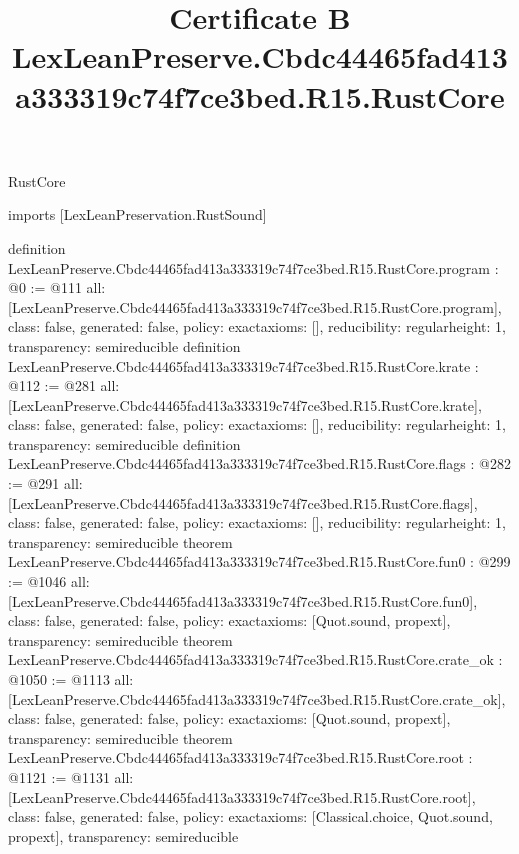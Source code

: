 \begin{lexlean}{RustCore}
\title{Certificate B LexLeanPreserve.Cbdc44465fad413a333319c74f7ce3bed.R15.RustCore}
\begin{coremodule}
imports [LexLeanPreservation.RustSound]

definition LexLeanPreserve.Cbdc44465fad413a333319c74f7ce3bed.R15.RustCore.program : @0 := @111 {
  all: [LexLeanPreserve.Cbdc44465fad413a333319c74f7ce3bed.R15.RustCore.program],
  class: false,
  generated: false,
  policy: exact{axioms: []},
  reducibility: regular{height: 1},
  transparency: semireducible
}
definition LexLeanPreserve.Cbdc44465fad413a333319c74f7ce3bed.R15.RustCore.krate : @112 := @281 {
  all: [LexLeanPreserve.Cbdc44465fad413a333319c74f7ce3bed.R15.RustCore.krate],
  class: false,
  generated: false,
  policy: exact{axioms: []},
  reducibility: regular{height: 1},
  transparency: semireducible
}
definition LexLeanPreserve.Cbdc44465fad413a333319c74f7ce3bed.R15.RustCore.flags : @282 := @291 {
  all: [LexLeanPreserve.Cbdc44465fad413a333319c74f7ce3bed.R15.RustCore.flags],
  class: false,
  generated: false,
  policy: exact{axioms: []},
  reducibility: regular{height: 1},
  transparency: semireducible
}
theorem LexLeanPreserve.Cbdc44465fad413a333319c74f7ce3bed.R15.RustCore.fun0 : @299 := @1046 {
  all: [LexLeanPreserve.Cbdc44465fad413a333319c74f7ce3bed.R15.RustCore.fun0],
  class: false,
  generated: false,
  policy: exact{axioms: [Quot.sound, propext]},
  transparency: semireducible
}
theorem LexLeanPreserve.Cbdc44465fad413a333319c74f7ce3bed.R15.RustCore.crate_ok : @1050 := @1113 {
  all: [LexLeanPreserve.Cbdc44465fad413a333319c74f7ce3bed.R15.RustCore.crate_ok],
  class: false,
  generated: false,
  policy: exact{axioms: [Quot.sound, propext]},
  transparency: semireducible
}
theorem LexLeanPreserve.Cbdc44465fad413a333319c74f7ce3bed.R15.RustCore.root : @1121 := @1131 {
  all: [LexLeanPreserve.Cbdc44465fad413a333319c74f7ce3bed.R15.RustCore.root],
  class: false,
  generated: false,
  policy: exact{axioms: [Classical.choice, Quot.sound, propext]},
  transparency: semireducible
}


\end{coremodule}
\end{lexlean}
